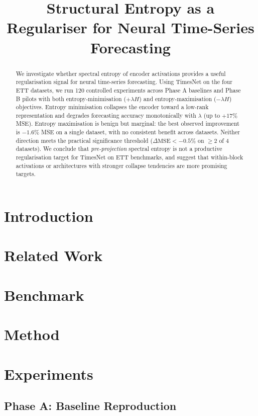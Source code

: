 \documentclass[10pt]{article}
\title{Structural Entropy as a Regulariser for Neural Time-Series Forecasting}
\author{}
\date{}
\begin{document}
\maketitle

\begin{abstract}
We investigate whether spectral entropy of encoder activations provides a
useful regularisation signal for neural time-series forecasting.
Using TimesNet on the four ETT datasets, we run 120 controlled experiments
across Phase A baselines and Phase B pilots with both entropy-minimisation
($+\lambda H$) and entropy-maximisation ($-\lambda H$) objectives.
Entropy minimisation collapses the encoder toward a low-rank representation
and degrades forecasting accuracy monotonically with $\lambda$ (up to $+17\%$
MSE).
Entropy maximisation is benign but marginal: the best observed improvement is
$-1.6\%$ MSE on a single dataset, with no consistent benefit across datasets.
Neither direction meets the practical significance threshold
($\Delta\text{MSE} < -0.5\%$ on $\geq\!2$ of 4 datasets).
We conclude that \emph{pre-projection} spectral entropy is not a productive
regularisation target for TimesNet on ETT benchmarks, and suggest that
within-block activations or architectures with stronger collapse tendencies
are more promising targets.
\end{abstract}

\section{Introduction}

\section{Related Work}

\section{Benchmark}

\section{Method}

\section{Experiments}

\subsection{Phase A: Baseline Reproduction}
\label{sec:phase_a}
\end{document}
